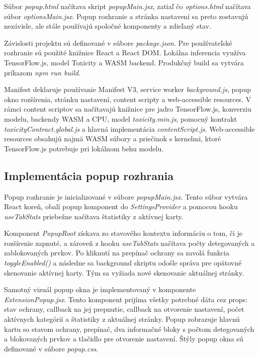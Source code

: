 Súbor \emph{popup.html} načítava skript \emph{popupMain.jsx}, zatiaľ čo \emph{options.html} načítava súbor \emph{optionsMain.jsx}. Popup rozhranie a stránka nastavení sa preto zostavujú nezávisle, ale stále používajú spoločné komponenty a zdieľaný stav.

Závislosti projektu sú definované v súbore \emph{package.json}. Pre používateľské rozhranie sú použité knižnice React a React DOM. Lokálna inferencia využíva TensorFlow.js, model Toxicity a WASM backend. Produkčný build sa vytvára príkazom \emph{npm run build}.

Manifest deklaruje používanie Manifest V3, service worker \emph{background.js}, popup okno rozšírenia, stránku nastavení, content scripty a web-accessible resources. V rámci content scriptov sa načítavajú knižnice pre jadro TensorFlow.js, konverziu modelu, backendy WASM a CPU, model \emph{toxicity.min.js}, pomocný kontrakt \emph{toxicityContract.global.js} a hlavná implementácia \emph{contentScript.js}. Web-accessible resources obsahujú najmä WASM súbory a priečinok s kernelmi, ktoré TensorFlow.js potrebuje pri lokálnom behu modelu.

\subsection{Implementácia popup rozhrania}
Popup rozhranie je inicializované v súbore \emph{popupMain.jsx}. Tento súbor vytvára React koreň, obalí popup komponent do \emph{SettingsProvider} a pomocou hooku \emph{useTabStats} priebežne načítava štatistiky z aktívnej karty.

Komponent \emph{PopupRoot} získava zo stavového kontextu informáciu o tom, či je rozšírenie zapnuté, a zároveň z hooku \emph{useTabStats} načítava počty detegovaných a zablokovaných prvkov. Po kliknutí na prepínač ochrany sa zavolá funkcia \emph{toggleEnabled()} a následne sa background skriptu odošle správa pre opätovné skenovanie aktívnej karty. Tým sa vyžiada nové skenovanie aktuálnej stránky.

Samotný vizuál popup okna je implementovaný v komponente \emph{ExtensionPopup.jsx}. Tento komponent prijíma všetky potrebné dáta cez props: stav ochrany, callback na jej prepnutie, callback na otvorenie nastavení, počet aktívnych kategórií a štatistiky z aktuálnej stránky. Popup zobrazuje hlavnú kartu so stavom ochrany, prepínač, dva informačné bloky s počtom detegovaných a blokovaných prvkov a tlačidlo pre otvorenie nastavení. Štýly popup okna sú definované v súbore \emph{popup.css}.

